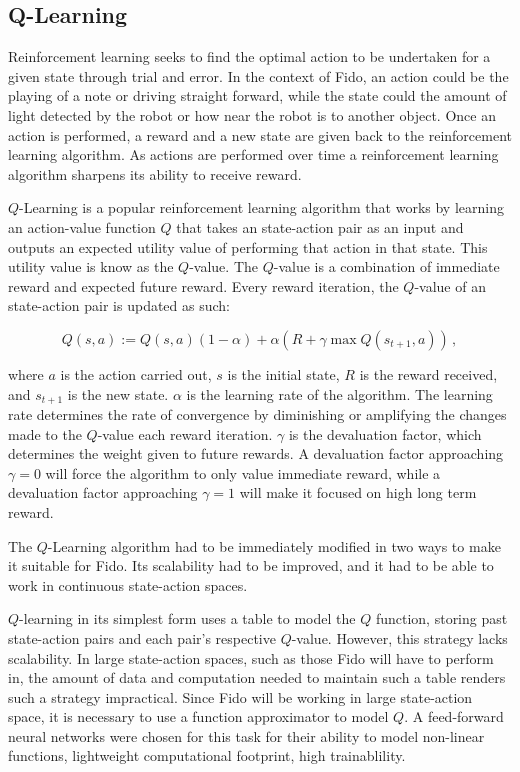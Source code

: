 \subsection{Q-Learning}

Reinforcement learning seeks to find the optimal action to be undertaken for a given state through trial and error. In the context of Fido, an action could be the playing of a note or driving straight forward, while the state could the amount of light detected by the robot or how near the robot is to another object. Once an action is performed, a reward and a new state are given back to the reinforcement learning algorithm.  As actions are performed over time a reinforcement learning algorithm sharpens its ability to receive reward.

$Q$-Learning \cite{watkins} is a popular reinforcement learning algorithm that works by learning an action-value function $Q$ that takes an state-action pair as an input and outputs an expected utility value of performing that action in that state. This utility value is know as the $Q$-value. The $Q$-value is a combination of immediate reward and expected future reward. Every reward iteration, the $Q$-value of an state-action pair is updated as such:

\begin{equation}
	Q(s, a) := Q(s, a)(1 - \alpha) + \alpha(R + \gamma \max Q(s_{t+1}, a))
	\,,
	\label{equ::updateqlearn}
\end{equation}

\noindent
where $a$ is the action carried out, $s$ is the initial state, $R$ is the reward received, and $s_{t+1}$ is the new state. $\alpha$ is the learning rate of the algorithm. The learning rate determines the rate of convergence by diminishing or amplifying the changes made to the $Q$-value each reward iteration. $\gamma$ is the devaluation factor, which determines the weight given to future rewards. A devaluation factor approaching $\gamma=0$ will force the algorithm to only value immediate reward, while a devaluation factor approaching $\gamma=1$ will make it focused on high long term reward.

The $Q$-Learning algorithm had to be immediately modified in two ways to make it suitable for Fido. Its scalability had to be improved, and it had to be able to work in continuous state-action spaces. 

$Q$-learning in its simplest form uses a table to model the $Q$ function, storing past state-action pairs and each pair's respective $Q$-value.  However, this strategy lacks scalability. In large state-action spaces, such as those Fido will have to perform in, the amount of data and computation needed to maintain such a table renders such a strategy impractical. Since Fido will be working in large state-action space, it is necessary to use a function approximator to model $Q$. A feed-forward neural networks were chosen for this task for their ability to model non-linear functions, lightweight computational footprint, high trainablility.

